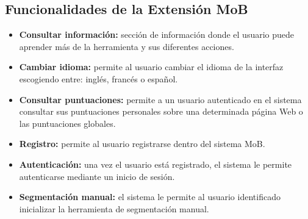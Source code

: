 \documentclass[10pt]{revecom}
\begin{document}
\subsection{Funcionalidades de la Extensión MoB}
\begin{itemize}
\item \textbf{Consultar información:} sección de información donde el usuario puede aprender más de la herramienta y sus diferentes acciones.
\item \textbf{Cambiar idioma:} permite al usuario cambiar el idioma de la interfaz escogiendo entre: inglés, francés o español. 
\item \textbf{Consultar puntuaciones:} permite a un usuario autenticado en el sistema consultar sus puntuaciones personales sobre una determinada página Web o las puntuaciones globales. 
\item \textbf{Registro:} permite al usuario registrarse dentro del sistema MoB.
\item \textbf{Autenticación:} una vez el usuario está registrado, el sistema le permite autenticarse mediante un inicio de sesión. 
\item \textbf{Segmentación manual:} el sistema le permite al usuario identificado inicializar la herramienta de segmentación manual.
\end{itemize}
\end{document}
